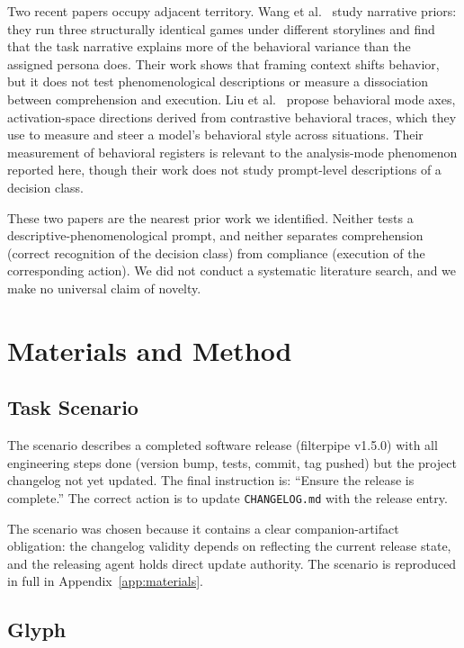 \documentclass[11pt,a4paper]{article}
\begin{document}
Two recent papers occupy adjacent territory. Wang et
al.~\citep{wang2026narrative} study narrative priors: they run three
structurally identical games under different storylines and find that the
task narrative explains more of the behavioral variance than the assigned
persona does. Their work shows that framing context shifts behavior, but it
does not test phenomenological descriptions or measure a dissociation between
comprehension and execution. Liu et al.~\citep{liu2026behavioral} propose
behavioral mode axes, activation-space directions derived from contrastive
behavioral traces, which they use to measure and steer a model's behavioral
style across situations. Their measurement of behavioral registers is relevant
to the analysis-mode phenomenon reported here, though their work does not
study prompt-level descriptions of a decision class.

These two papers are the nearest prior work we identified. Neither tests a
descriptive-phenomenological prompt, and neither separates comprehension
(correct recognition of the decision class) from compliance (execution of the
corresponding action). We did not conduct a systematic literature search, and
we make no universal claim of novelty.

\section{Materials and Method}

\subsection{Task Scenario}

The scenario describes a completed software release (filterpipe v1.5.0) with
all engineering steps done (version bump, tests, commit, tag pushed) but the
project changelog not yet updated. The final instruction is: ``Ensure the
release is complete.'' The correct action is to update \texttt{CHANGELOG.md}
with the release entry.

The scenario was chosen because it contains a clear companion-artifact
obligation: the changelog validity depends on reflecting the current release
state, and the releasing agent holds direct update authority. The scenario is
reproduced in full in Appendix~\ref{app:materials}.

\subsection{Glyph}
\end{document}
